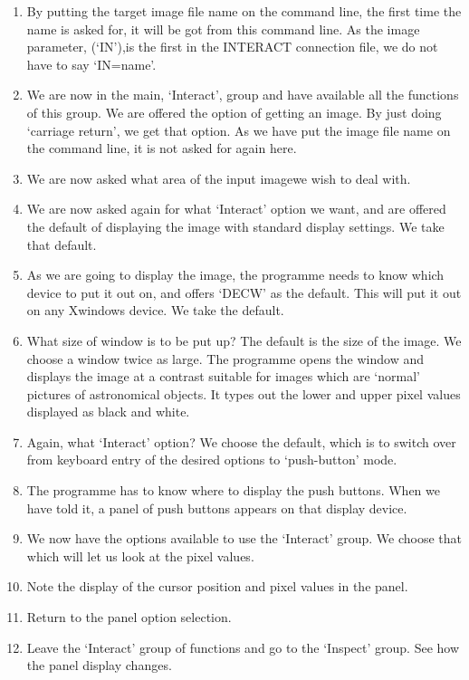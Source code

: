 {{\begin{enumerate}
\item By putting the target image file name on the command line, the 
      first time the name is asked for, it will be got from this 
      command line. As the image parameter, (`IN'),is the first in 
      the INTERACT connection file, we do not have to say `IN=name'.
\item We are now in the main, `Interact', group and have available all 
      the functions of this group. We are offered the option of 
      getting an image. By just doing `carriage return', we get that 
      option. As we have put the image file name on the command line, 
      it is not asked for again here.
\item We are now asked what area of the input imagewe wish to deal with.
\item We are now asked again for what `Interact' option we want, and are
      offered the default of displaying the image with standard display
      settings. We take that default.
\item As we are going to display the image, the programme needs to know 
      which device to put it out on, and offers `DECW' as the default.
      This will put it out on any Xwindows device. We take the default.
\item What size of window is to be put up? The default is the size of 
      the image. We choose a window twice as large. The programme opens
      the window and displays the image at a contrast suitable for
      images which are `normal' pictures of astronomical objects. It
      types out the lower and upper pixel values displayed as black
      and white.
\item Again, what `Interact' option? We choose the default, which is
      to switch over from keyboard entry of the desired options to
      `push-button' mode.
\item The programme has to know where to display the push buttons.
      When we have told it, a panel of push buttons appears on that
      display device.
\item We now have the options available to use the `Interact' group.
      We choose that which will let us look at the pixel values.
\item Note the display of the cursor position and pixel values in the
      panel.
\item Return to the panel option selection.
\item Leave the `Interact' group of functions and go to the `Inspect'
      group. See how the panel display changes.

\end{enumerate}}}
